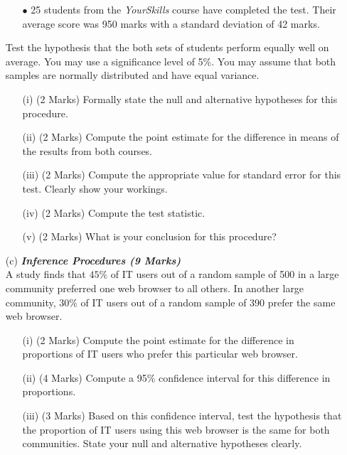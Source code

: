 \documentclass[]{article}
\begin{document}
\begin{itemize}
\begin{itemize}
\item[$\bullet$]25 students from the \textit{YourSkills} course have completed the test. Their average score was 950 marks with a standard deviation of 42 marks.
\end{itemize}

Test the hypothesis that the both sets of students perform equally well on average. You may use a significance level of 5\%. You may assume that both samples are normally distributed and have equal variance.
\begin{itemize}
\item[(i)] (2 Marks) Formally state the null and alternative hypotheses for this procedure.
\item[(ii)] (2 Marks) Compute the point estimate for the difference in means of the results from both courses.
\item[(iii)] (2 Marks) Compute the appropriate value for standard error for this test. Clearly show your workings.
\item[(iv)] (2 Marks) Compute the test statistic.
\item[(v)] (2 Marks) What is your conclusion for this procedure?
\end{itemize}

\newpage
\item[(c)] \textbf{\textit{Inference Procedures (9 Marks)}}\\A study finds that $45\%$ of IT users out of a random sample of 500 in a large
community preferred one web browser to all others. In another large community, $30\%$ of IT users out of a random sample of 390 prefer the same web browser.

\begin{itemize}
\item[(i)] (2 Marks) Compute the point estimate for the difference in proportions of IT users who prefer this particular web browser.
\item[(ii)] (4 Marks) Compute a 95\% confidence interval for this difference in proportions.
\item[(iii)] (3 Marks) Based on this confidence interval, test the hypothesis that the proportion of IT users using this web browser is the same for both communities. State your null and alternative hypotheses clearly.
\end{itemize}

\end{itemize}
\end{document}
